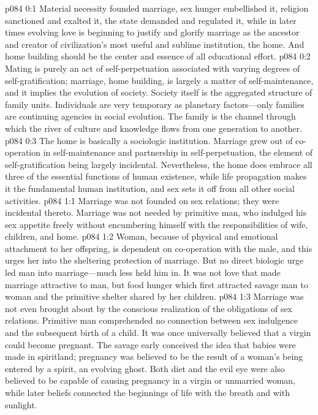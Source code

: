 \author{Chief of Seraphim}
\vs p084 0:1 Material necessity founded marriage, sex hunger embellished it, religion sanctioned and exalted it, the state demanded and regulated it, while in later times evolving love is beginning to justify and glorify marriage as the ancestor and creator of civilization’s most useful and sublime institution, the home. And home building should be the center and essence of all educational effort.\plusone
\vs p084 0:2 Mating is purely an act of self\hyp{}perpetuation associated with varying degrees of self\hyp{}gratification; marriage, home building, is largely a matter of self\hyp{}maintenance, and it implies the evolution of society. Society itself is the aggregated structure of family units. Individuals are very temporary as planetary factors---only families are continuing agencies in social evolution. The family is the channel through which the river of culture and knowledge flows from one generation to another.
\vs p084 0:3 The home is basically a sociologic institution. Marriage grew out of co\hyp{}operation in self\hyp{}maintenance and partnership in self\hyp{}perpetuation, the element of self\hyp{}gratification being largely incidental. Nevertheless, the home does embrace all three of the essential functions of human existence, while life propagation makes it the fundamental human institution, and sex sets it off from all other social activities.
\vs p084 1:1 Marriage was not founded on sex relations; they were incidental thereto. Marriage was not needed by primitive man, who indulged his sex appetite freely without encumbering himself with the responsibilities of wife, children, and home.
\vs p084 1:2 Woman, because of physical and emotional attachment to her offspring, is dependent on co\hyp{}operation with the male, and this urges her into the sheltering protection of marriage. But no direct biologic urge led man into marriage---much less held him in. It was not love that made marriage attractive to man, but food hunger which first attracted savage man to woman and the primitive shelter shared by her children.
\pc \vs p084 1:3 Marriage was not even brought about by the conscious realization of the obligations of sex relations. Primitive man comprehended no connection between sex indulgence and the subsequent birth of a child. It was once universally believed that a virgin could become pregnant. The savage early conceived the idea that babies were made in spiritland; pregnancy was believed to be the result of a woman’s being entered by a spirit, an evolving ghost. Both diet and the evil eye were also believed to be capable of causing pregnancy in a virgin or unmarried woman, while later beliefs connected the beginnings of life with the breath and with sunlight.
